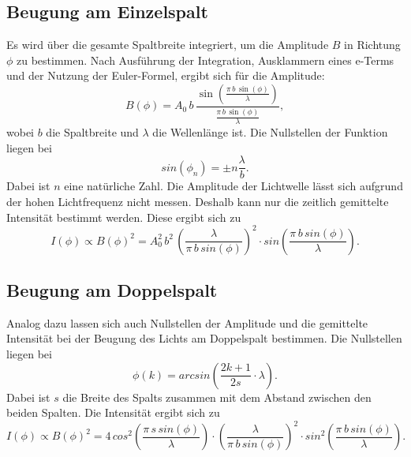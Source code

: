 \subsection{Beugung am Einzelspalt}
Es wird über die gesamte Spaltbreite integriert, um die 
Amplitude $B$ in Richtung $\phi$ zu bestimmen. Nach Ausführung 
der Integration, Ausklammern eines e-Terms und der Nutzung 
der Euler-Formel, ergibt sich für die Amplitude:
\begin{equation*}
    B(\phi) = A_0 \, b \, \frac{\sin(\frac{\pi \, b \, \sin(\phi)}{\lambda})}{\frac{\pi \, b \, \sin(\phi)}{\lambda}},
\end{equation*}
wobei $b$ die Spaltbreite und $\lambda$ 
die Wellenlänge ist. 
Die Nullstellen der Funktion liegen bei
\begin{equation} 
    sin(\phi_n)= \pm n \frac{\lambda}{b}.
    \label{eqn:nullstellen}
\end{equation}
Dabei ist $n$ eine natürliche Zahl.
Die Amplitude der Lichtwelle lässt sich aufgrund der hohen 
Lichtfrequenz nicht messen. Deshalb kann nur die zeitlich 
gemittelte Intensität bestimmt werden. 
\newline
Diese ergibt sich zu 
\begin{equation}
    I(\phi) \propto B(\phi)^2 = A^{2}_0 \, b^2 \, \left(\frac{\lambda}{\pi \, b \, sin(\phi)} \right)^2 \cdot sin \left(\frac{\pi \, b \, sin(\phi)}{\lambda}\right).
    \label{eqn:intensität}
\end{equation}

\subsection{Beugung am Doppelspalt}
Analog dazu lassen sich auch Nullstellen der Amplitude und 
die gemittelte Intensität bei der Beugung des Lichts am 
Doppelspalt bestimmen.
Die Nullstellen liegen bei 
\begin{equation}
    \phi(k) = arcsin \left(\frac{2k+1}{2s}\cdot \lambda \right).
    \label{eqn:doppelns}
\end{equation}
Dabei ist $s$ die Breite des Spalts zusammen mit
dem Abstand zwischen den beiden Spalten.
\newline
Die Intensität ergibt sich zu 
\begin{equation}
    I(\phi) \propto B(\phi)^2 =4 \, cos^2 \left(\frac{\pi \, s \, sin(\phi)}{\lambda} \right)\cdot \left(\frac{\lambda}{\pi \, b \, sin(\phi)} \right)^2 \cdot sin^2 \left(\frac{\pi \, b \, sin(\phi)}{\lambda}\right).
    \label{eqn:doppelintensität}
\end{equation}